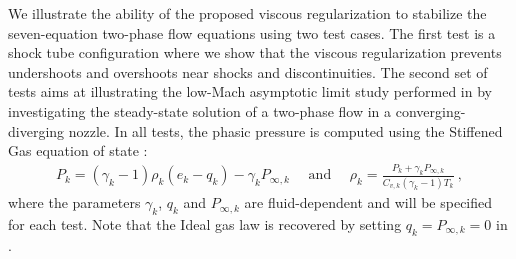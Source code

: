 We illustrate the ability of the proposed viscous regularization to stabilize the 
seven-equation two-phase flow equations using two test cases. 
The first test is a shock tube configuration where we show that the viscous regularization prevents undershoots 
and overshoots near shocks and discontinuities. The second set of tests aims at illustrating the low-Mach asymptotic limit study performed in  by investigating the steady-state solution
of a two-phase flow in a converging-diverging nozzle. In all tests, the phasic pressure is computed using the Stiffened Gas equation of state \cite{SGEOS}:
%
\begin{align}\label{eq:sgeos}
P_k = (\gamma_k-1) \rho_k( e_k -q_k) -\gamma_k P_{\infty,k} \quad \text{ and } \quad 
\rho_k = \frac{P_k+\gamma_k P_{\infty,k}}{C_{v,k} (\gamma_k-1)T_k} \ ,
\end{align}
%
where the parameters $\gamma_k$, $q_k$ and $P_{\infty,k}$ are fluid-dependent and will be specified for each test. Note that the Ideal gas law is recovered by setting 
$q_k = P_{\infty,k}=0$ in .
%
